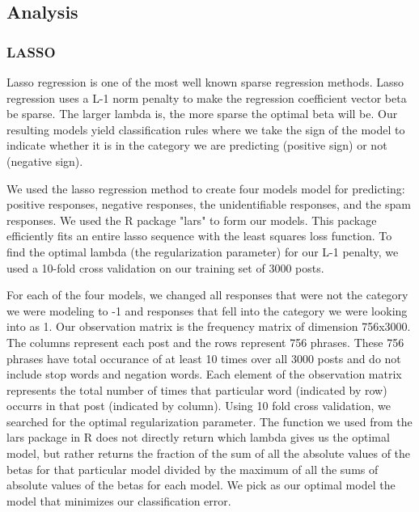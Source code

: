 \documentclass[11pt]{article}
\newcommand{\1}[1]{{\mathbf 1}\left\{#1\right\}}        %
\begin{document}
\subsection{Analysis}


\subsubsection{LASSO}
Lasso regression is one of the most well known sparse regression methods. Lasso regression uses a L-1 norm penalty to make the regression coefficient vector beta be sparse.  The larger lambda is, the more sparse the optimal beta will be. Our resulting models yield classification rules where we take the sign of the model to indicate whether it is in the category we are predicting (positive sign) or not (negative sign). 

We used the lasso regression method to create four models model for predicting: positive responses, negative responses, the unidentifiable responses, and the spam responses.  We used the R package "lars" to form our models. This package efficiently fits an entire lasso sequence with the least squares loss function.  To find the optimal lambda (the regularization parameter) for our L-1 penalty, we used a 10-fold cross validation on our training 
set of 3000 posts. 

For each of the four models, we changed all responses that were not the category we were modeling to -1 and responses that fell into the category we were looking into as 1. Our observation matrix is the frequency matrix of dimension 756x3000. The columns represent each post and the rows represent 756 phrases.  These 756 phrases have total occurance of at least 10 times over all 3000 posts and do not include stop words and negation words. Each element of the observation matrix represents the total number of times that particular word (indicated by row) occurrs in that post (indicated by column). Using 10 fold cross validation, we searched for the optimal regularization parameter.  The function we used from the lars package in R does not 
directly return which lambda gives us the optimal model, but rather returns the fraction of the sum of all the absolute values of the betas for that particular model divided by the maximum of all the sums of absolute values of the betas for each model. We pick as our optimal model the model that minimizes our classification error. 
\end{document}
